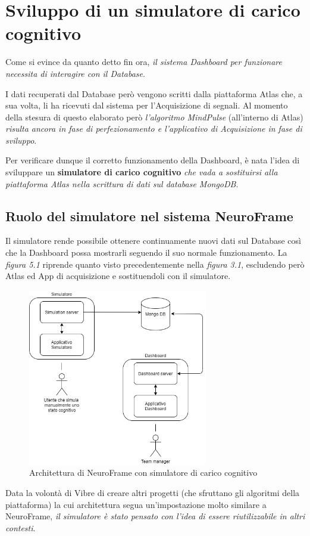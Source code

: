 \section{Sviluppo di un simulatore di carico cognitivo}
Come si evince da quanto detto fin ora, \emph{il sistema Dashboard per funzionare necessita di interagire con il Database}.\newline

\noindent I dati recuperati dal Database però vengono scritti dalla piattaforma Atlas che, a sua volta, li ha ricevuti dal sistema per l'Acquisizione di segnali.\newline
Al momento della stesura di questo elaborato però \emph{l'algoritmo MindPulse} (all'interno di Atlas) \emph{risulta ancora in fase di perfezionamento e l'applicativo di Acquisizione in fase di sviluppo}.\newline

\noindent Per verificare dunque il corretto funzionamento della Dashboard, è nata l'idea di sviluppare un {\bf simulatore di carico cognitivo} \emph{che vada a sostituirsi alla piattaforma Atlas nella scrittura di dati sul database MongoDB}.
\subsection{Ruolo del simulatore nel sistema NeuroFrame}
Il simulatore rende possibile ottenere continuamente nuovi dati sul Database così che la Dashboard possa mostrarli seguendo il suo normale funzionamento.\newline
La \emph{figura 5.1} riprende quanto visto precedentemente nella \emph{figura 3.1}, escludendo però Atlas ed App di acquisizione e sostituendoli con il simulatore.
\vspace{5mm}
\begin{figure}[H]
  \centering
  \includegraphics[width=0.7\textwidth]{img/NeuroFrameSimulatore.png}
  \caption{Architettura di NeuroFrame con simulatore di carico cognitivo}
\end{figure}
\vspace{5mm}
\noindent Data la volontà di Vibre di creare altri progetti (che sfruttano gli algoritmi della piattaforma) la cui architettura segua un'impostazione molto similare a NeuroFrame, \emph{il simulatore è stato pensato con l'idea di essere riutilizzabile in altri contesti}.\newline

